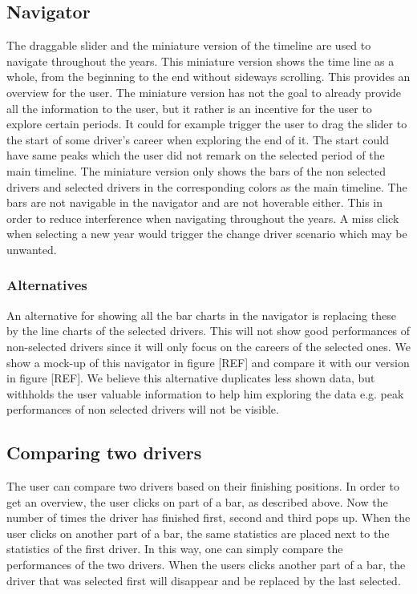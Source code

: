 \documentclass{sigchi}
\begin{document}
\subsection{Navigator}

The draggable slider and the miniature version of the timeline are used to navigate throughout the years. This miniature version shows the time line as a whole, from the beginning to the end without sideways scrolling. This provides an overview for the user. The miniature version has not the goal to already provide all the information to the user, but it rather is an incentive for the user to explore certain periods. It could for example trigger the user to drag the slider to the start of some driver’s career when exploring the end of it. The start could have same peaks which the user did not remark on the selected period of the main timeline.  The miniature version only shows the bars of the non selected drivers and selected drivers in the corresponding colors as the main timeline. The bars are not navigable in the navigator and are not hoverable either. This in order to reduce interference when navigating throughout the years. A miss click when selecting a new year would trigger the change driver scenario which may be unwanted. 

\subsubsection{Alternatives}
An alternative for showing all the bar charts in the navigator is replacing these by the line charts of the selected drivers. This will not show good performances of non-selected drivers since it will only focus on the careers of the selected ones. We show a mock-up of this navigator in figure [REF] and compare it with our version in figure [REF]. We believe this alternative duplicates less shown data, but withholds the user valuable information to help him exploring the data e.g. peak performances of non selected drivers will not be visible.

\subsection{Comparing two drivers}

The user can compare two drivers based on their finishing positions. In order to get an overview, the user clicks on part of a bar, as described above. Now the number of times the driver has finished first, second and third pops up. When the user clicks on another part of a bar, the same statistics are placed next to the statistics of the first driver. In this way, one can simply compare the performances of the two drivers. When the users clicks another part of a bar, the driver that was selected first will disappear and be replaced by the last selected.
\end{document}
